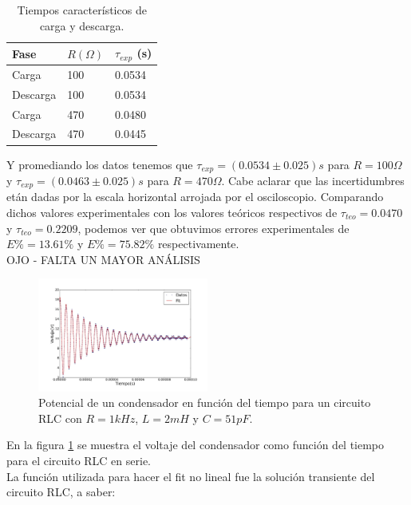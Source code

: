 \documentclass[prb,aps,twocolumn,preprintnumbers,amsmath,amssymb]{revtex4}
\begin{document}
\begin{table}[h!]
	\caption{\label{Tabla 1}Tiempos característicos de carga y descarga.}
	\begin{ruledtabular}
		\begin{tabular}{||M{2.5cm}|M{2.5cm}|M{2.5cm}||}
			Fase & $R (\Omega)$ & $\tau_{exp}$ (s)\\
			\hline
			Carga & 100 & 0.0534\\
			Descarga & 100 &  0.0534\\
			Carga & 470 & 0.0480\\
			Descarga & 470 & 0.0445\\
		\end{tabular}
	\end{ruledtabular}
\end{table}

Y promediando los datos tenemos que $\tau_{exp} = (0.0534 \pm 0.025) s$ para $R = 100 \Omega$ y $\tau_{exp} = (0.0463 \pm 0.025) s$ para $R = 470 \Omega$. Cabe aclarar que las incertidumbres etán dadas por la escala horizontal arrojada por el osciloscopio. Comparando dichos valores experimentales con los valores teóricos respectivos de $\tau_{teo} = 0.0470$ y $\tau_{teo} = 0.2209$, podemos ver que obtuvimos errores experimentales de $E\% = 	13.61 \%$ y $E\% = 75.82 \%$ respectivamente.\\

OJO - FALTA UN MAYOR ANÁLISIS\\

\begin{figure}[h!]
	\centering
	\includegraphics[width=0.5\textwidth,height=0.25\textheight]{amorti1}
	\caption{Potencial de un condensador en función del tiempo para un circuito RLC con $R = 1 kHz$, $L = 2 mH$ y $C = 51 pF$.}
	\label{fig: amorti1}
\end{figure}

En la figura \ref{fig: amorti1} se muestra el voltaje del condensador como función del tiempo para el circuito RLC en serie.\\

La función utilizada para hacer el fit no lineal fue la solución transiente del circuito RLC, a saber:
\end{document}
